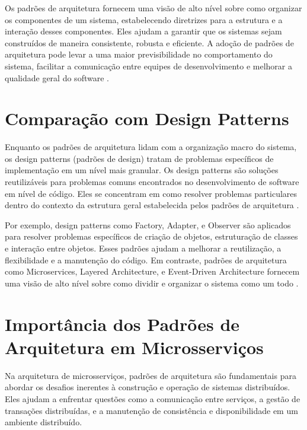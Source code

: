Os padrões de arquitetura fornecem uma visão de alto nível sobre como organizar os componentes de um sistema, estabelecendo diretrizes para a estrutura e a interação desses componentes. Eles ajudam a garantir que os sistemas sejam construídos de maneira consistente, robusta e eficiente. A adoção de padrões de arquitetura pode levar a uma maior previsibilidade no comportamento do sistema, facilitar a comunicação entre equipes de desenvolvimento e melhorar a qualidade geral do software \cite{fowler2011}.

\section{Comparação com Design Patterns}

Enquanto os padrões de arquitetura lidam com a organização macro do sistema, os design patterns (padrões de design) tratam de problemas específicos de implementação em um nível mais granular. Os design patterns são soluções reutilizáveis para problemas comuns encontrados no desenvolvimento de software em nível de código. Eles se concentram em como resolver problemas particulares dentro do contexto da estrutura geral estabelecida pelos padrões de arquitetura \cite{gamma1994}.

Por exemplo, design patterns como Factory, Adapter, e Observer são aplicados para resolver problemas específicos de criação de objetos, estruturação de classes e interação entre objetos. Esses padrões ajudam a melhorar a reutilização, a flexibilidade e a manutenção do código. Em contraste, padrões de arquitetura como Microservices, Layered Architecture, e Event-Driven Architecture fornecem uma visão de alto nível sobre como dividir e organizar o sistema como um todo \cite{fowler2011}.

\section{Importância dos Padrões de Arquitetura em Microsserviços}

Na arquitetura de microsserviços, padrões de arquitetura são fundamentais para abordar os desafios inerentes à construção e operação de sistemas distribuídos. Eles ajudam a enfrentar questões como a comunicação entre serviços, a gestão de transações distribuídas, e a manutenção de consistência e disponibilidade em um ambiente distribuído.

